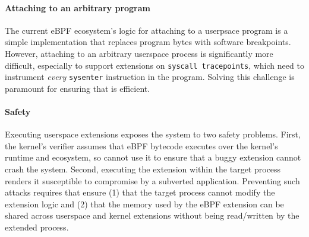 \paragraph{Attaching to an arbitrary program} The current eBPF ecosystem's logic for attaching to a userpsace program is a simple implementation that replaces program bytes with software breakpoints.  However, attaching to an arbitrary userspace process is significantly more difficult, especially to support extensions on \texttt{syscall tracepoints}, which need to instrument \emph{every} \texttt{sysenter} instruction in the program.  Solving this challenge is paramount for ensuring that \sys{} is efficient.

\paragraph{Safety} Executing userspace extensions exposes the system to two safety problems.  First, the kernel's verifier assumes that eBPF bytecode executes over the kernel's runtime and ecosystem, so \sys cannot use it to ensure that a buggy extension cannot crash the system.  Second, executing the extension within the target process renders it susceptible to compromise by a subverted application.  Preventing such attacks requires that \sys{} ensure (1) that the target process cannot modify the extension logic and (2) that the memory used by the eBPF extension can be shared across userspace and kernel extensions without being read/written by the extended process.

